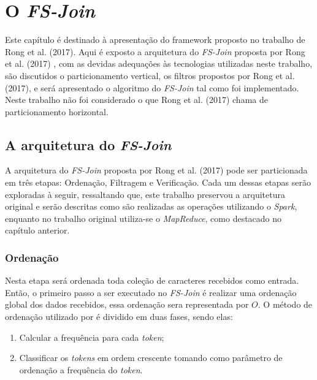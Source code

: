 \chapter{O \textit{FS-Join}}
\label{cap:cap2}

Este capítulo é destinado à apresentação do framework proposto no trabalho de Rong et al. (2017)\cite{Rong:2017:FS-Join}. Aqui é exposto a arquitetura do \textit{FS-Join} proposta por Rong et al. (2017) \cite{Rong:2017:FS-Join}, com as devidas adequações às tecnologias utilizadas neste trabalho, são discutidos o particionamento vertical, os filtros propostos por Rong et al. (2017)\cite{Rong:2017:FS-Join}, e será apresentado o algoritmo do \textit{FS-Join} tal como foi implementado. Neste trabalho não foi considerado o que Rong et al. (2017)\cite{Rong:2017:FS-Join} chama de particionamento horizontal.

\section{A arquitetura do \textit{FS-Join}}

A arquitetura do \textit{FS-Join} proposta por  Rong et al. (2017) \cite{Rong:2017:FS-Join} pode ser particionada em três etapas: Ordenação, Filtragem e Verificação. Cada um dessas etapas serão exploradas à seguir, ressaltando que, este trabalho preservou a arquitetura original e serão descritas como são realizadas as operações utilizando o \textit{Spark}, enquanto no trabalho original utiliza-se o \textit{MapReduce}, como destacado no capítulo anterior.

\subsection{Ordenação}

Nesta etapa será ordenada toda coleção de caracteres recebidos como entrada. Então, o primeiro passo a ser executado no \textit{FS-Join} é realizar uma ordenação global dos dados recebidos, essa ordenação sera representada por $O$. O método de ordenação utilizado por \cite{Rong:2017:FS-Join} é dividido em duas fases, sendo elas:
\begin{enumerate}
\item  Calcular a frequência para cada \textit{token};
\item  Classificar os \textit{tokens} em ordem crescente tomando como parâmetro de ordenação a frequência do \textit{token}.
\end{enumerate}

